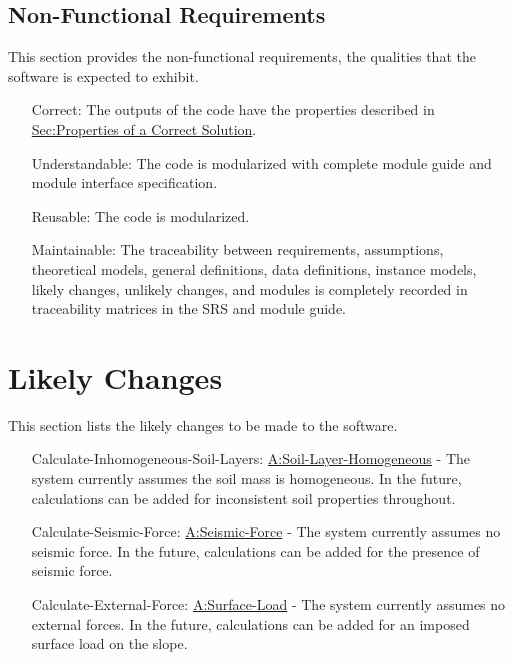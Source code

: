 \documentclass[12pt]{article}
\begin{document}
\subsection{Non-Functional Requirements}
\label{Sec:NFRs}
This section provides the non-functional requirements, the qualities that the software is expected to exhibit.

\begin{itemize}
\item[Correct:\phantomsection\label{correct}]{The outputs of the code have the properties described in \hyperref[Sec:CorSolProps]{Sec:Properties of a Correct Solution}.}
\item[Understandable:\phantomsection\label{understandable}]{The code is modularized with complete module guide and module interface specification.}
\item[Reusable:\phantomsection\label{reusable}]{The code is modularized.}
\item[Maintainable:\phantomsection\label{maintainable}]{The traceability between requirements, assumptions, theoretical models, general definitions, data definitions, instance models, likely changes, unlikely changes, and modules is completely recorded in traceability matrices in the SRS and module guide.}
\end{itemize}
\section{Likely Changes}
\label{Sec:LCs}
This section lists the likely changes to be made to the software.

\begin{itemize}
\item[Calculate-Inhomogeneous-Soil-Layers:\phantomsection\label{LC_inhomogeneous}]{\hyperref[assumpSLH]{A:Soil-Layer-Homogeneous} - The system currently assumes the soil mass is homogeneous. In the future, calculations can be added for inconsistent soil properties throughout.}
\item[Calculate-Seismic-Force:\phantomsection\label{LC_seismic}]{\hyperref[assumpSF]{A:Seismic-Force} - The system currently assumes no seismic force. In the future, calculations can be added for the presence of seismic force.}
\item[Calculate-External-Force:\phantomsection\label{LC_external}]{\hyperref[assumpSL]{A:Surface-Load} - The system currently assumes no external forces. In the future, calculations can be added for an imposed surface load on the slope.}
\end{itemize}
\end{document}
